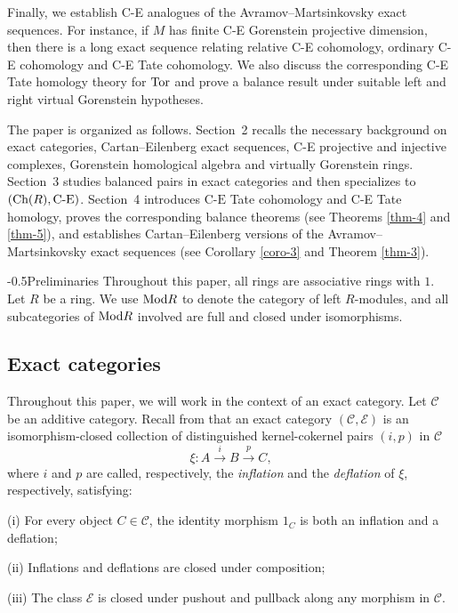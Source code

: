 \documentclass[reqno,12pt]{amsart}
\makeatletter
\numberwithin{equation}{section}
\def\Ch{\mbox{\rm Ch}}
\theoremstyle{plain}
\theoremstyle{definition}
\newcommand{\CE}{\mathrm{C}\text{-}\mathrm{E}}
\renewcommand{\section}{\@startsection{section}{1}{0mm}
  {-\baselineskip}{0.5\baselineskip}{\bf\leftline}}
\makeatother
\begin{document}
Finally, we establish C-E analogues of the Avramov--Martsinkovsky exact sequences. For instance, if $M$ has finite C-E Gorenstein projective dimension, then there is a long exact sequence relating relative C-E cohomology, ordinary C-E cohomology and C-E Tate cohomology. We also discuss the corresponding C-E Tate homology theory for $\mbox{\rm Tor}$ and prove a balance result under suitable left and right virtual Gorenstein hypotheses.

The paper is organized as follows. Section~2 recalls the necessary background on exact categories, Cartan--Eilenberg exact sequences, C-E projective and injective complexes, Gorenstein homological algebra and virtually Gorenstein rings. Section~3 studies balanced pairs in exact categories and then specializes to $(\Ch(R),\CE)$. Section~4 introduces $\CE$ Tate cohomology and C-E Tate homology, proves the corresponding balance theorems (see Theorems \ref{thm-4} and \ref{thm-5}), and establishes Cartan--Eilenberg versions of the Avramov--Martsinkovsky exact sequences (see Corollary \ref{coro-3} and Theorem \ref{thm-3}).






\section{Preliminaries}
Throughout this paper, all rings are associative rings with $1$. Let $R$ be a ring. We use $\mbox{\rm Mod} R$ to
denote the category of left $R$-modules,
and all subcategories of $\mbox{\rm Mod} R$ involved are full and closed under isomorphisms.
\subsection{Exact categories}
Throughout this paper, we will work in the context of an exact category. Let $\mathcal{C}$ be an additive category. Recall from \cite{B10} that an exact category
$(\mathcal{C},\mathcal{E})$ is an isomorphism-closed collection of
distinguished kernel-cokernel pairs $(i,p)$ in $\mathcal{C}$ $$\xi :A\stackrel{i}\to B
\stackrel{p}\to C,$$ where $i$ and $p$ are called, respectively, the {\it inflation} and the {\it deflation} of
$\xi$, respectively, satisfying:

{\rm (i)} For every object $C\in\mathcal{C}$, the identity morphism $1_{C}$ is both an inflation and a deflation;

{\rm (ii)} Inflations and deflations are closed under composition;

{\rm (iii)} The class $\mathcal{E}$ is closed under pushout and pullback along any morphism in $\mathcal{C}$.
\end{document}
